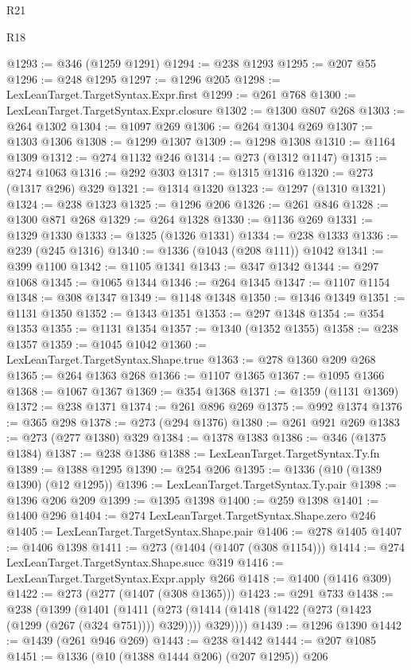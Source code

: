 \begin{lexlean}{R21}
\begin{lexlean}{R18}
\begin{coremodule}
{{{{{{{{{{{{{{{{{{{{{{{{{{{{{{{{{{{{{{{{{{{{{{{{{{{{{{{{{{{{{{{{{{{{{{{{{{{{{{{{{{{{{{{{{{{{{{{{{{{{{{{{{{{{{{{{{{{{{{{{{{{{{{{{{{{{{{{{{{{{{{{@1293 := @346 (@1259 @1291)
@1294 := @238 @1293
@1295 := @207 @55
@1296 := @248 @1295
@1297 := @1296 @205
@1298 := LexLeanTarget.TargetSyntax.Expr.first
@1299 := @261 @768
@1300 := LexLeanTarget.TargetSyntax.Expr.closure
@1302 := @1300 @807 @268
@1303 := @264 @1302
@1304 := @1097 @269
@1306 := @264 @1304 @269
@1307 := @1303 @1306
@1308 := @1299 @1307
@1309 := @1298 @1308
@1310 := @1164 @1309
@1312 := @274 @1132 @246
@1314 := @273 (@1312 @1147)
@1315 := @274 @1063
@1316 := @292 @303
@1317 := @1315 @1316
@1320 := @273 (@1317 @296) @329
@1321 := @1314 @1320
@1323 := @1297 (@1310 @1321)
@1324 := @238 @1323
@1325 := @1296 @206
@1326 := @261 @846
@1328 := @1300 @871 @268
@1329 := @264 @1328
@1330 := @1136 @269
@1331 := @1329 @1330
@1333 := @1325 (@1326 @1331)
@1334 := @238 @1333
@1336 := @239 (@245 @1316)
@1340 := @1336 (@1043 (@208 @111)) @1042
@1341 := @399 @1100
@1342 := @1105 @1341
@1343 := @347 @1342
@1344 := @297 @1068
@1345 := @1065 @1344
@1346 := @264 @1345
@1347 := @1107 @1154
@1348 := @308 @1347
@1349 := @1148 @1348
@1350 := @1346 @1349
@1351 := @1131 @1350
@1352 := @1343 @1351
@1353 := @297 @1348
@1354 := @354 @1353
@1355 := @1131 @1354
@1357 := @1340 (@1352 @1355)
@1358 := @238 @1357
@1359 := @1045 @1042
@1360 := LexLeanTarget.TargetSyntax.Shape.true
@1363 := @278 @1360 @209 @268
@1365 := @264 @1363 @268
@1366 := @1107 @1365
@1367 := @1095 @1366
@1368 := @1067 @1367
@1369 := @354 @1368
@1371 := @1359 (@1131 @1369)
@1372 := @238 @1371
@1374 := @261 @896 @269
@1375 := @992 @1374
@1376 := @365 @298
@1378 := @273 (@294 @1376)
@1380 := @261 @921 @269
@1383 := @273 (@277 @1380) @329
@1384 := @1378 @1383
@1386 := @346 (@1375 @1384)
@1387 := @238 @1386
@1388 := LexLeanTarget.TargetSyntax.Ty.fn
@1389 := @1388 @1295
@1390 := @254 @206
@1395 := @1336 (@10 (@1389 @1390) (@12 @1295))
@1396 := LexLeanTarget.TargetSyntax.Ty.pair
@1398 := @1396 @206 @209
@1399 := @1395 @1398
@1400 := @259 @1398
@1401 := @1400 @296
@1404 := @274 LexLeanTarget.TargetSyntax.Shape.zero @246
@1405 := LexLeanTarget.TargetSyntax.Shape.pair
@1406 := @278 @1405
@1407 := @1406 @1398
@1411 := @273 (@1404 (@1407 (@308 @1154)))
@1414 := @274 LexLeanTarget.TargetSyntax.Shape.succ @319
@1416 := LexLeanTarget.TargetSyntax.Expr.apply @266
@1418 := @1400 (@1416 @309)
@1422 := @273 (@277 (@1407 (@308 @1365)))
@1423 := @291 @733
@1438 := @238
    (@1399
      (@1401
        (@1411 (@273 (@1414 (@1418 (@1422 (@273 (@1423 (@1299 (@267 (@324 @751)))) @329)))) @329))))
@1439 := @1296 @1390
@1442 := @1439 (@261 @946 @269)
@1443 := @238 @1442
@1444 := @207 @1085
@1451 := @1336 (@10 (@1388 @1444 @206) (@207 @1295)) @206
}}}}}}}}}}}}}}}}}}}}}}}}}}}}}}}}}}}}}}}}}}}}}}}}}}}}}}}}}}}}}}}}}}}}}}}}}}}}}}}}}}}}}}}}}}}}}}}}}}}}}}}}}}}}}}}}}}}}}}}}}}}}}}}}}}}}}}}}}}}}}}}
\end{coremodule}
\end{lexlean}
\end{lexlean}
